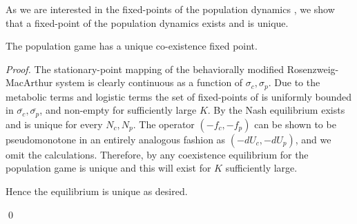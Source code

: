 As we are interested in the fixed-points of the population dynamics , we show that a fixed-point of the population dynamics exists and is unique.
\begin{theorem}
  The population game  has a unique co-existence fixed point.
\end{theorem}
\begin{proof}
The stationary-point mapping of the behaviorally modified Rosenzweig-MacArthur system is clearly continuous as a function of $\sigma_c,\sigma_p$. Due to the metabolic terms and logistic terms the set of fixed-points of is uniformly bounded in $\overbar{\sigma_c}, \overbar{\sigma_p}$, and non-empty for sufficiently large $K$. By  the Nash equilibrium exists and is unique for every $N_c, N_p$. The operator $(-f_c, -f_p)$ can be shown to be pseudomonotone in an entirely analogous fashion as $(-dU_c, -dU_p)$, and we omit the calculations. Therefore, by  any coexistence equilibrium for the population game is unique and this will exist for $K$ sufficiently large.
\begin{comment}



For the stability, remark that the fixed point is the only place where the Nash equilibrium leads to zero pr. capita growth rates $(f_c, f_p)$, and that the pr. capita growth rates are dominated by the monomorphic equivalent payoff-functions $U_c^{mon}, U_p^{mon}$. As we maximize the payoff-functions at every point $(N_c,N_p)$, a decrease in the maximal value of the payoff-function will also lead to a decrease in the growth rate.
Increasing $N_c$ and keeping $N_p^*$ fixed will lead to the maximal value of $U_c$ strictly decreasing, while the maximal value of $U_p$ will strictly increase, hence the value at the Nash equilibrium will weakly increase. Hence, as long as the population $N_p^*$ is less than $\frac{1}{\beta_0 + \exp{-3^2}}$

 Correspondingly, an increase in $N_p$ and keeping $N_c^*$ fixed will decrease the maximal value of $U_c^{mon}$ and $U_p^{mon}$, forcing $f_c$ and $f_p$ to become negative. Increasing both will also cause both to become negative. If we only increase $N_c$ and decrease $N_p$, then the situation is more complicated. At very low values of $N_p$ and $N_c$ less than the maximum for logistic growth, both $f_c$ and $f_p$ will become positive as we are nearly in the situation with logistic growth. As we we either pass the threshold for the stable point in the logistic growth, or $N_p$ becomes sufficiently large, the signs of both reverse.
Therefore any flow will eventually end up above $(N_c^*,N_p^*)$, where it will be attracted to the fixed point.

Hence the system is stable, and the equilibirum is unique as desired.
\end{comment}
Hence the equilibrium is unique as desired.

\qed
\end{proof}
